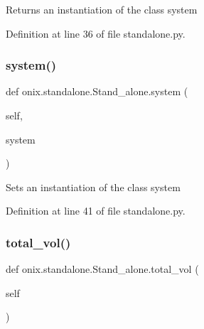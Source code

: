 \begin{DoxyVerb}Returns an instantiation of the class system\end{DoxyVerb}
 

Definition at line 36 of file standalone.\+py.

\mbox{\label{classonix_1_1standalone_1_1Stand__alone_a5816d85a07f60c443271ecdbcde30bf4}} 
\subsubsection{\texorpdfstring{system()}{system()}\hspace{0.1cm}{\footnotesize\ttfamily [2/2]}}
{\footnotesize\ttfamily def onix.\+standalone.\+Stand\+\_\+alone.\+system (\begin{DoxyParamCaption}\item[{}]{self,  }\item[{}]{system }\end{DoxyParamCaption})}

\begin{DoxyVerb}Sets an instantiation of the class system\end{DoxyVerb}
 

Definition at line 41 of file standalone.\+py.

\mbox{\label{classonix_1_1standalone_1_1Stand__alone_a0cb64bc7dd487ea661af433a79fc5255}} 
\subsubsection{\texorpdfstring{total\+\_\+vol()}{total\_vol()}\hspace{0.1cm}{\footnotesize\ttfamily [1/2]}}
{\footnotesize\ttfamily def onix.\+standalone.\+Stand\+\_\+alone.\+total\+\_\+vol (\begin{DoxyParamCaption}\item[{}]{self }\end{DoxyParamCaption})}

